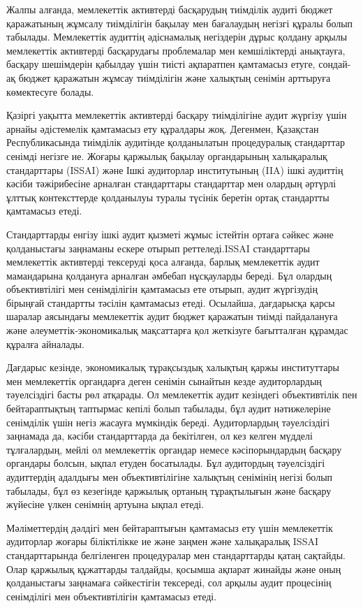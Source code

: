 Жалпы алғанда, мемлекеттік активтерді басқарудың тиімділік аудиті бюджет
қаражатының жұмсалу тиімділігін бақылау мен бағалаудың негізгі құралы
болып табылады. Мемлекеттік аудиттің әдіснамалық негіздерін дұрыс
қолдану арқылы мемлекеттік активтерді басқарудағы проблемалар мен
кемшіліктерді анықтауға, басқару шешімдерін қабылдау үшін тиісті
ақпаратпен қамтамасыз етуге, сондай-ақ бюджет қаражатын жұмсау
тиімділігін және халықтың сенімін арттыруға көмектесуге болады.

Қазіргі уақытта мемлекеттік активтерді басқару тиімділігіне аудит
жүргізу үшін арнайы әдістемелік қамтамасыз ету құралдары жоқ. Дегенмен,
Қазақстан Республикасында тиімділік аудитінде қолданылатын процедуралық
стандарттар сенімді негізге ие. Жоғары қаржылық бақылау органдарының
халықаралық стандарттары (ISSAI) және Ішкі аудиторлар институтының (IIA)
ішкі аудиттің кәсіби тәжірибесіне арналған стандарттары стандарттар мен
олардың әртүрлі ұлттық контексттерде қолданылуы туралы түсінік беретін
ортақ стандартты қамтамасыз етеді.

Стандарттарды енгізу ішкі аудит қызметі жұмыс істейтін ортаға сәйкес
және қолданыстағы заңнаманы ескере отырып реттеледі.ISSAI стандарттары
мемлекеттік активтерді тексеруді қоса алғанда, барлық мемлекеттік аудит
мамандарына қолдануға арналған әмбебап нұсқауларды береді. Бұл олардың
объективтілігі мен сенімділігін қамтамасыз ете отырып, аудит жүргізудің
бірыңғай стандартты тәсілін қамтамасыз етеді. Осылайша, дағдарысқа қарсы
шаралар аясындағы мемлекеттік аудит бюджет қаражатын тиімді пайдалануға
және әлеуметтік-экономикалық мақсаттарға қол жеткізуге бағытталған
құрамдас құралға айналады.

Дағдарыс кезінде, экономикалық тұрақсыздық халықтың қаржы институттары
мен мемлекеттік органдарға деген сенімін сынайтын кезде аудиторлардың
тәуелсіздігі басты рөл атқарады. Ол мемлекеттік аудит кезіндегі
объективтілік пен бейтараптықтың таптырмас кепілі болып табылады, бұл
аудит нәтижелеріне сенімділік үшін негіз жасауға мүмкіндік береді.
Аудиторлардың тәуелсіздігі заңнамада да, кәсіби стандарттарда да
бекітілген, ол кез келген мүдделі тұлғалардың, мейлі ол мемлекеттік
органдар немесе кәсіпорындардың басқару органдары болсын, ықпал етуден
босатылады. Бұл аудитордың тәуелсіздігі аудиттердің адалдығы мен
объективтілігіне халықтың сенімінің негізі болып табылады, бұл өз
кезегінде қаржылық ортаның тұрақтылығын және басқару жүйесіне үлкен
сенімнің артуына ықпал етеді.

Мәліметтердің дәлдігі мен бейтараптығын қамтамасыз ету үшін мемлекеттік
аудиторлар жоғары біліктілікке ие және заңмен және халықаралық ISSAI
стандарттарында белгіленген процедуралар мен стандарттарды қатаң
сақтайды. Олар қаржылық құжаттарды талдайды, қосымша ақпарат жинайды
және оның қолданыстағы заңнамаға сәйкестігін тексереді, сол арқылы аудит
процесінің сенімділігі мен объективтілігін қамтамасыз етеді.

